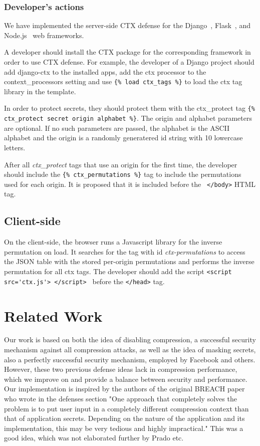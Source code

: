 \documentclass[a4paper, 11 pt, conference]{article}  %
\begin{document}
\subsubsection{Developer's actions}
We have implemented the server-side CTX defense for the Django~\cite{c13},
Flask~\cite{c14}, and Node.js~\cite{c15} web frameworks.

A developer should install the CTX package for the corresponding framework in
order to use CTX defense. For example, the developer of a Django project should
add django-ctx to the installed apps, add the ctx processor to the
context\_processors setting and use \lstinline|{% load ctx_tags %}| to load the ctx tag library in the template.

In order to protect secrets, they should protect them with the ctx\_protect tag \lstinline|{% ctx_protect secret origin alphabet %}|. The origin and alphabet parameters are optional. If no such parameters are passed, the alphabet is the ASCII alphabet and the origin is a randomly generatered id string with 10 lowercase letters.

After all \textit{ctx\_protect} tags that use an origin for the first time, the developer should include the \lstinline|{% ctx_permutations %}| tag to include the permutations used for each origin. It is proposed that it is included before the \lstinline| </body>| HTML tag.

\subsection{Client-side}
On the client-side, the browser runs a Javascript library for the inverse permutation on load. It searches for the tag with id \textit{ctx-permutations} to access the JSON table with the stored per-origin permutations and performs the inverse permutation for all ctx tags.
The developer should add the script \lstinline|<script src='ctx.js'> </script> | before the \lstinline|</head>| tag.

\section{Related Work}

Our work is based on both the idea of disabling compression, a successful
security mechanism against all compression attacks, as well as the idea of
masking secrets, also a perfectly successful security mechanism, employed by
Facebook and others. However, these two previous defense ideas lack in
compression performance, which we improve on and provide a balance between
security and performance. Our implementation is inspired by the authors of the original BREACH paper who wrote in the defenses section "One approach that completely solves the problem is to put user input in a completely different compression context than that of application secrets. Depending on the nature of the application and its implementation, this may be very tedious and highly impractical." This was a good idea, which was not elaborated further by Prado etc.
\end{document}
